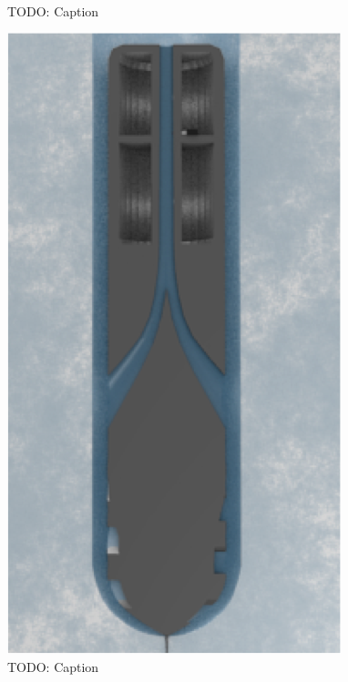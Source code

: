 \begin{figure}[htb]
	\centering
	\\
	\caption{TODO: Caption}
	\label{fig:3d_model}
\end{figure}

\begin{figure}[htb]
	\centering
	\includegraphics[width=.5\textwidth]{figures/convection/water_transportation.png}
	\caption{TODO: Caption}
	\label{fig:water_transportation}
\end{figure}

